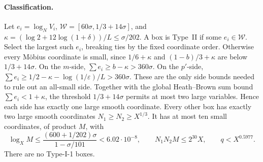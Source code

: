 \paragraph{Classification.}
Let \(e_i=\log_NV_i\), \(\mathcal W=[60\sigma,1/3+14\sigma]\), and
\(\kappa=(\log2+12\log(1+\delta))/L\le\sigma/202\). A box is Type~II if
some \(e_i\in\mathcal W\). Select the largest such \(e_i\), breaking ties
by the fixed coordinate order. Otherwise every Möbius coordinate is small, since
\(1/6+\kappa\) and \((1-b)/3+\kappa\) are below \(1/3+14\sigma\). On the
\(m\)-side, \(\sum e_i\ge b-\kappa>360\sigma\). On the \(p'\)-side,
\(\sum e_i\ge1/2-\kappa-\log(1/\varepsilon)/L>360\sigma\). These are the only side bounds
needed to rule out an all-small side. Together with the global Heath--Brown
sum bound \(\sum e_i<1+\kappa\), the threshold \(1/3+14\sigma\) permits
at most two large variables. Hence each side has exactly one large smooth
coordinate. Every other box has exactly two large smooth coordinates \(N_1\ge N_2\ge X^{1/3}\). It has at most ten small
coordinates, of product \(M\), with
\begin{equation}\label{eq:k2-r3-typeI2}
 \log_XM\le\frac{(600+1/202)\sigma}{1-\sigma/101}<6.02\cdot10^{-8},
 \qquad N_1N_2M\le2^{30}X,\qquad q<X^{0.5977}.
\end{equation}
There are no Type-I-1 boxes.

